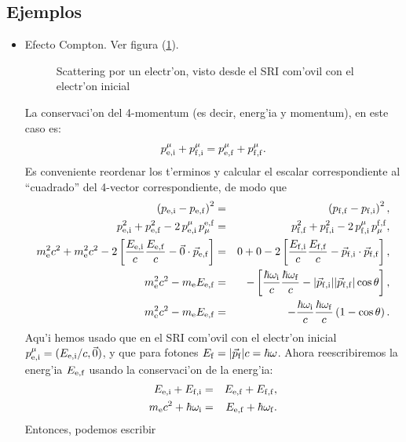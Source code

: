 \subsection{Ejemplos}
\begin{itemize}
\item Efecto Compton. Ver figura (\ref{fig:Compton}).
\begin{figure}[ht]
\centerline{}
\caption{Scattering por un electr'on, visto desde el SRI com'ovil con el electr'on inicial}
\label{fig:Compton}
\end{figure}
La conservaci'on del 4-momentum (es decir, energ'ia y momentum), en este caso
es:
\begin{equation}
p^\mu_{\rm e,i}+p^\mu_{\rm f,i}=p^\mu_{\rm e,f}+p^\mu_{\rm f,f}.
\end{equation}
Es conveniente reordenar los t'erminos y calcular el escalar correspondiente al
``cuadrado'' del 4-vector correspondiente, de modo que
\begin{eqnarray}
\left( p_{\rm e,i}-p_{\rm e,f}\right)^2 &=&\left( p_{\rm f,f}-p_{\rm
f,i}\right)^2 ,\\
p^2_{\rm e,i}+p^2_{\rm e,f}-2\,p^\mu_{\rm e,i}\,p_\mu^{\rm e,f} &=& p^2_{\rm
f,f}+p^2_{\rm f,i}-2\,p^\mu_{\rm f,i}\,p_\mu^ {\rm f,f},\\
m_{\rm e}^2 c^2+m_{\rm e}^2 c^2-2\left[\frac{E_{\rm e,i}}{c}\frac{E_{\rm e,f}}{c}-\vec{0}\cdot\vec{p}_{\rm e,f}\right] &=&
0+0-2\left[\frac{E_{\rm f,i}}{c}\frac{E_{\rm f,f}}{c}-\vec{p}_{\rm
f,i}\cdot\vec{p}_{\rm f,f}\right] ,\\
m_{\rm e}^2 c^2-m_{\rm e}E_{\rm e,f} &=& -\left[
\frac{\hbar\omega_{\rm i}}{c}\frac{\hbar\omega_{\rm f}}{c}-|\vec{p}_{\rm f,i}||\vec{p}_{\rm f,f}|\cos\theta\right] , \\
m_{\rm e}^2 c^2-m_{\rm e}E_{\rm e,f} &=&
-\frac{\hbar\omega_{\rm i}}{c}\frac{\hbar\omega_{\rm f}}{c}\left(1 -\cos\theta\right) .
\end{eqnarray}
Aqu'i hemos usado que en el SRI com'ovil con el electr'on inicial $p^\mu_{\rm
e,i}=({E_{\rm e,i}}/{c},\vec{0})$, y que para fotones $E_{\rm
f}=|\vec{p}_{\rm f}|c=\hbar\omega$. Ahora reescribiremos la energ'ia $E_{\rm
e,f}$ usando la conservaci'on de la energ'ia:
\begin{eqnarray}
E_{\rm e,i}+E_{\rm f,i}&=&E_{\rm e,f}+E_{\rm f,f}, \\
m_{\rm e}c^2+\hbar\omega_{\rm i} &=&E_{\rm e,f}+\hbar\omega_{\rm f} .
\end{eqnarray}
Entonces, podemos escribir

\end{itemize}
